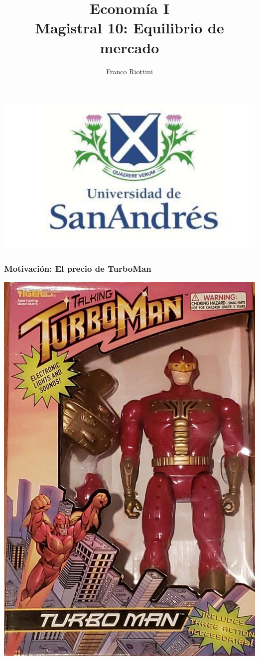 \documentclass{beamer}
\title[Economía I]{Economía I \vspace{4mm}
\\ Magistral 10: Equilibrio de mercado}
\date{}
\author[Riottini]{Franco Riottini}
\institute[]{Universidad de San Andrés}
\begin{document}
\begin{frame}
\titlepage
\centering
\includegraphics[scale=0.2]{../Figures/logoUDESA.jpg} 
\end{frame} 

\begin{frame}
\frametitle{Motivación: El precio de TurboMan}
\centering
\href{https://www.youtube.com/watch?v=UIBRtxVG_LE&list=PL1Sd7Ozmz5CcoC_5lrL0pLKYXXLOLUhd2&index=12}{\includegraphics[scale=0.1]{../Figures/Tema_04.01_Turboman.jpg}}
\end{frame}
\end{document}
